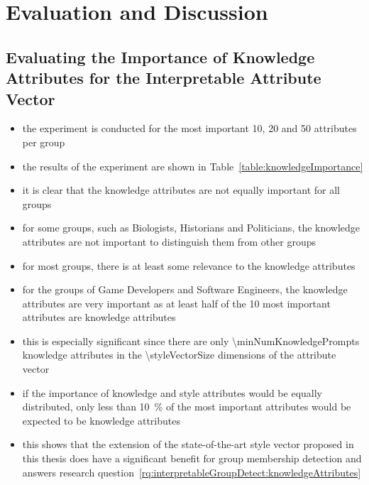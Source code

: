 \chapter{Evaluation and Discussion}
\label{sec:evaluation}

\section{Evaluating the Importance of Knowledge Attributes for the Interpretable Attribute Vector}
\label{sec:evaluation:knowledgeAttributes}
\begin{itemize}
  \item the experiment is conducted for the most important \num{10}, \num{20} and \num{50} attributes per group
  \item the results of the experiment are shown in Table~\ref{table:knowledgeImportance}
  \item it is clear that the knowledge attributes are not equally important for all groups
  \item for some groups, such as Biologists, Historians and Politicians, the knowledge attributes are not important to distinguish them from other groups
  \item for most groups, there is at least some relevance to the knowledge attributes
  \item for the groups of Game Developers and Software Engineers, the knowledge attributes are very important as at least half of the \num{10} most important attributes are knowledge attributes
  \item this is especially significant since there are only \num{\minNumKnowledgePrompts} knowledge attributes in the \num{\styleVectorSize} dimensions of the attribute vector
  \item if the importance of knowledge and style attributes would be equally distributed, only less than \SI{10}{\percent} of the most important attributes would be expected to be knowledge attributes
  \item this shows that the extension of the state-of-the-art style vector proposed in this thesis does have a significant benefit for group membership detection and answers research question~\ref{rq:interpretableGroupDetect:knowledgeAttributes}
\end{itemize}
